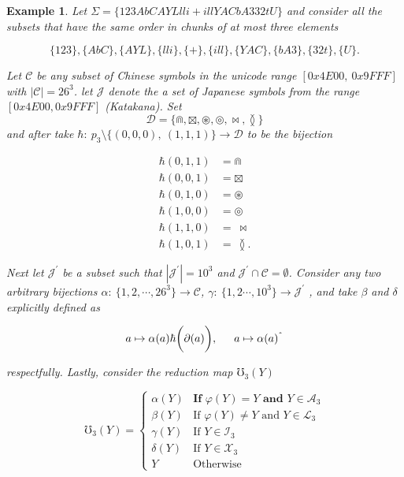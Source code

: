 \documentclass[amsmath,12pt,a4paper]{amsart}
\newtheorem{example}{Example}
\begin{document}
\begin{example}\label{Ex1}
Let $\Sigma = \{123AbCAYLlli+illYACbA332tU\}$ and consider all the subsets that have the same order in chunks of at most three elements 

\begin{equation}\label{Eq16}
\{123\}, \{AbC\}, \{AYL\}, \{lli\}, \{+\},\{ill\}, \{YAC\}, \{bA3\}, \{32t\} , \{U\}.
\end{equation}

Let $\mathcal{C}$ be any subset of Chinese symbols in the unicode range $[0x4E00,~0x9FFF]$ with $|\mathcal{C}|=26^3$. let $\mathcal{J}$ denote the a set of Japanese symbols from the range $[0x4E00,0x9FFF]$ (Katakana). Set $$\mathcal{D} = \{\Cap, \boxtimes, \circledast, \circledcirc,\bowtie, \between \}$$ and after take $\hbar:~p_3\setminus \{(0,0,0),~(1,1,1)\}\rightarrow \mathcal{D} $ to be the bijection


\begin{equation}\label{Eq17}
\begin{split}
\hbar(0,1,1) & = \Cap\\
\hbar(0,0,1) & = \boxtimes \\
\hbar(0,1,0) & = \circledast \\
\hbar(1,0,0) & = \circledcirc \\
\hbar(1,1,0) & = ~\bowtie \\
\hbar(1,0,1) & = ~\between.
\end{split}
\end{equation}

Next let $\mathcal{J}^\prime$ be a subset such that $|\mathcal{J}^\prime| = 10^3$ and $\mathcal{J}^\prime \cap \mathcal{C} = \emptyset$. Consider any two arbitrary bijections $\alpha:~\{1,2,\cdots, 26^3\} \rightarrow \mathcal{C}$, $\gamma:~\{1,2\cdots, 10^3\}\rightarrow \mathcal{J}^\prime$ , and take $\beta$  and $\delta$ explicitly defined as 

\begin{equation}\label{Eq18}
a\mapsto \alpha(a) \hbar\biggl(\partial (a)\biggr), \indent a \mapsto \alpha(a)^{\texttt{\^{}}}
\end{equation}

respectfully. Lastly, consider the reduction map $\mho_3(Y)$ 

\begin{equation}\label{Eq19}
\mho_3(Y) = \begin{cases}
\alpha(Y) & \textbf{If $\varphi(Y) = Y$ and $Y\in \mathcal{A}_3$}\\
\beta(Y) & \text{If $\varphi(Y) \neq Y$ and $Y\in \mathcal{L}_3$}\\
\gamma(Y) & \text{If $Y\in \mathcal{I}_3$}\\
\delta(Y) & \text{If $Y \in \mathcal{X}_3$}\\
Y & \text{Otherwise}
\end{cases}
\end{equation}


\end{example}
\end{document}
